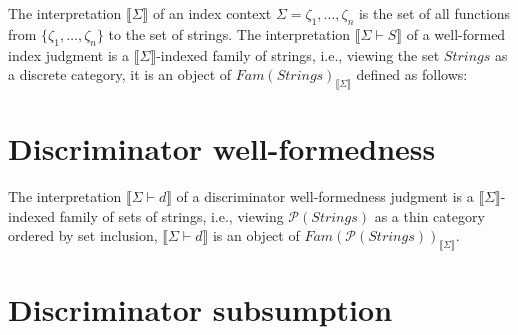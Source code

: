 \documentclass{article}
\newcommand{\sem}[1]{\llbracket #1 \rrbracket}
\begin{document}
The interpretation $\sem{\Sigma}$ of an index context $\Sigma = \zeta_1, \ldots, \zeta_n$ is the set of all functions from $\{ \zeta_1, \ldots, \zeta_n \}$ to the set of strings. The interpretation $\sem{\Sigma \vdash S}$ of a well-formed index judgment is a $\sem{\Sigma}$-indexed family of strings, i.e., viewing the set $\mathit{Strings}$ as a discrete category, it is an object of $\mathit{Fam}(\mathit{Strings})_{\sem{\Sigma}}$ defined as follows:

\section*{Discriminator well-formedness}


The interpretation $\sem{\Sigma \vdash d}$ of a discriminator well-formedness judgment is a $\sem{\Sigma}$-indexed family of sets of strings, i.e., viewing $\mathcal P(\mathit{Strings})$ as a thin category ordered by set inclusion, $\sem{\Sigma \vdash d}$ is an object of $\mathit{Fam}(\mathcal P(\mathit{Strings}))_{\sem{\Sigma}}$. 

\section*{Discriminator subsumption}

\end{document}
